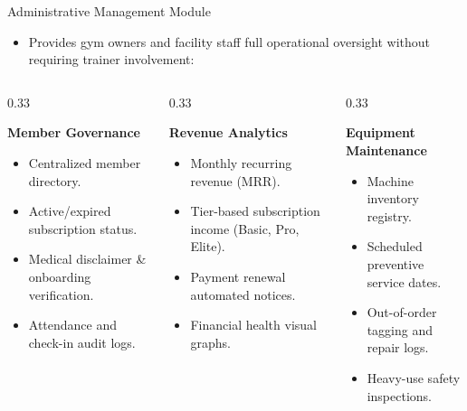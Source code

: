 \documentclass[aspectratio=169,10pt]{beamer}
\begin{document}
\begin{frame}{Administrative Management Module}
  \begin{itemize}
    \item Provides gym owners and facility staff full operational oversight without requiring trainer involvement:
  \end{itemize}
  \begin{columns}[T]
    \begin{column}{0.33\textwidth}
      \begin{block}{\textbf{Member Governance}}
        \begin{itemize}
          \item Centralized member directory.
          \item Active/expired subscription status.
          \item Medical disclaimer \& onboarding verification.
          \item Attendance and check-in audit logs.
        \end{itemize}
      \end{block}
    \end{column}
    \begin{column}{0.33\textwidth}
      \begin{block}{\textbf{Revenue Analytics}}
        \begin{itemize}
          \item Monthly recurring revenue (MRR).
          \item Tier-based subscription income (Basic, Pro, Elite).
          \item Payment renewal automated notices.
          \item Financial health visual graphs.
        \end{itemize}
      \end{block}
    \end{column}
    \begin{column}{0.33\textwidth}
      \begin{block}{\textbf{Equipment Maintenance}}
        \begin{itemize}
          \item Machine inventory registry.
          \item Scheduled preventive service dates.
          \item Out-of-order tagging and repair logs.
          \item Heavy-use safety inspections.
        \end{itemize}
      \end{block}
    \end{column}
  \end{columns}
\end{frame}
\end{document}
